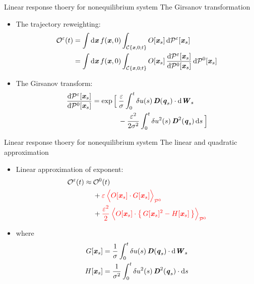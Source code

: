 \documentclass[fleqn]{beamer}
\newcommand{\redc}[1]{{\color{red} #1}}
\newcommand{\bluec}[1]{{\color{blue} #1}}
\newcommand{\vect}[1]{\textbf{\textit{#1}}}
\newcommand{\dd}[0]{\textrm{d}}
\newcommand{\fe}{u}
\newcommand{\eps}{\varepsilon}
\newcommand{\mo}{\mathcal O}
\newcommand{\mc}{\mathcal C}
\newcommand{\pathmeas}{\mathcal P}
\begin{document}
\begin{frame}{Linear response thoery for nonequilibrium system}
  {The Girsanov transformation}
  \begin{itemize}
  \item <1-> The trajectory reweighting:
    \bluec{
      \begin{align*}
        \mo^\eps(t)
        &= \int \dd \vect x\, f(\vect x, 0)
        \int_{\mc\{\vect x,0; t\}} O[\vect x_s]\,\dd \pathmeas^\eps[\vect x_s]\\
        &= \int \dd \vect x\, f(\vect x, 0)
        \int_{\mc\{\vect x,0; t\}} O[\vect x_s]\,
        \frac{\dd\pathmeas^\eps[\vect x_s]}{\dd\pathmeas^0[\vect x_s]}\,
        \dd\pathmeas^0[\vect x_s]
      \end{align*}
    }
  \item<2-> The \redc{Girsanov transform}:
    \bluec{
      \begin{align*}
        \frac{\dd\pathmeas^\eps[\vect x_s]}{\dd\pathmeas^0[\vect x_s]}
        =
        \exp
        \Big[\:&
        \frac{\eps}\sigma\int_0^t
        \delta\fe(s)\,\vect D(\vect q_s)\cdot\dd\vect W_s\\
        &-
        \frac {\eps^2}{2\sigma^2}\int_0^t
        \delta\fe^2(s)\,\vect D^2(\vect q_s)\,\dd s\:
        \Big]
      \end{align*}
    }
  \end{itemize}
\end{frame}



\begin{frame}{Linear response thoery for nonequilibrium system}
  {The linear and quadratic approximation}
  \begin{itemize}
  \item<1-> Linear approximation of exponent:
    \bluec{
      \begin{align*}
        \mo^\eps(t) \approx\: & \mo^0(t)\\
        &+
        \redc{\eps\:
          \Big\langle
          O[\vect x_s]\cdot G[\vect x_s]
          \Big\rangle_{\pathmeas^0}}
        \\
        &+
        \redc{
        \frac{\eps^2}2\:
        \Big\langle
        O[\vect x_s]\cdot \big\{\, G[\vect x_s]^2 - H[\vect x_s]\,\big\}
        \Big\rangle_{\pathmeas^0}}
      \end{align*}
    }
  \item<2-> where
    \bluec{
      \begin{align*}
        G[\vect x_s] & = \frac 1\sigma\int_0^t\delta\fe(s)\,\vect D(\vect q_s)\cdot \dd\vect W_s\\
        H[\vect x_s] & = \frac 1{\sigma^2}\int_0^t\delta\fe^2(s)\,\vect D^2(\vect q_s)\cdot \dd s
    \end{align*}
    }
  \end{itemize}
\end{frame}
\end{document}
